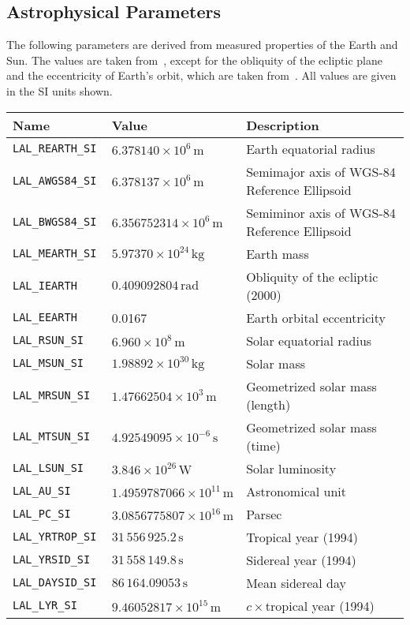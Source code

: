 \documentclass[10pt]{ligodcc}
\begin{document}
\subsection{Astrophysical Parameters}

The following parameters are derived from measured properties of the
Earth and Sun.  The values are taken from~\cite{Barnet:1996}, except
for the obliquity of the ecliptic plane and the eccentricity of
Earth's orbit, which are taken from~\cite{Lang:1992}.  All values are
given in the SI units shown.

\begin{center}
\begin{tabular}{|lll|}
\hline
Name & Value & Description \\
\hline
\tt LAL\_REARTH\_SI & $6.378140\times10^6\,\mathrm{m}$ &
        Earth equatorial radius \\
\tt LAL\_AWGS84\_SI & $6.378137\times10^6\,\mathrm{m}$ &
        Semimajor axis of WGS-84 Reference Ellipsoid \\
\tt LAL\_BWGS84\_SI & $6.356752314\times10^6\,\mathrm{m}$ &
        Semiminor axis of WGS-84 Reference Ellipsoid \\
\tt LAL\_MEARTH\_SI & $5.97370\times10^{24}\,\mathrm{kg}$ & Earth mass \\
\tt LAL\_IEARTH     & $0.409092804\,\mathrm{rad}$ &
        Obliquity of the ecliptic (2000) \\
\tt LAL\_EEARTH     & 0.0167 & Earth orbital eccentricity \\
\tt LAL\_RSUN\_SI   & $6.960\times10^8\,\mathrm{m}$ & Solar equatorial radius\\
\tt LAL\_MSUN\_SI   & $1.98892\times10^{30}\,\mathrm{kg}$ & Solar mass \\
\tt LAL\_MRSUN\_SI  & $1.47662504\times10^3\,\mathrm{m}$ &
        Geometrized solar mass (length) \\
\tt LAL\_MTSUN\_SI  & $4.92549095\times10^{-6}\,\mathrm{s}$ &
        Geometrized solar mass (time) \\
\tt LAL\_LSUN\_SI   & $3.846\times10^{26}\,\mathrm{W}$ & Solar luminosity \\
\tt LAL\_AU\_SI     & $1.4959787066\times10^{11}\,\mathrm{m}$ &
        Astronomical unit \\
\tt LAL\_PC\_SI     & $3.0856775807\times10^{16}\,\mathrm{m}$ & Parsec \\
\tt LAL\_YRTROP\_SI & $31\,556\,925.2\,\mathrm{s}$ & Tropical year (1994) \\
\tt LAL\_YRSID\_SI  & $31\,558\,149.8\,\mathrm{s}$ & Sidereal year (1994) \\
\tt LAL\_DAYSID\_SI & $86\,164.09053\,\mathrm{s}$ & Mean sidereal day \\
\tt LAL\_LYR\_SI    & $9.46052817\times10^{15}\,\mathrm{m}$ &
        $c\times$tropical year (1994) \\
\hline
\end{tabular}
\end{center}
\end{document}
